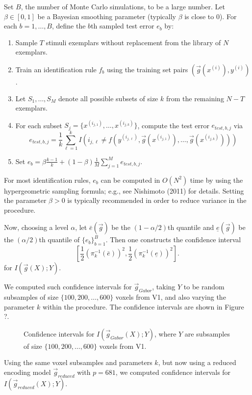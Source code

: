 \documentclass[12pt]{article}
\begin{document}
Set $B$, the number of Monte Carlo simulations, to be a large number.
Let $\beta \in [0, 1]$ be a Bayesian smoothing parameter (typically $\beta$ is close to 0).
For each $b = 1,\hdots, B$, define the $b$th sampled test error $e_b$ by:
\begin{enumerate}
\item Sample $T$ stimuli exemplars without replacement from the library of $N$ exemplars.
\item Train an identification rule $f_b$ using the training set pairs $(\vec{g}(x^{(i)}), y^{(i)})$.
\item Let $S_1,\hdots, S_M$ denote all possible subsets of size $k$ from the remaining $N-T$ exemplars.
\item For each subset $S_j = \{x^{(i_{j, 1})}, \hdots, x^{(i_{j, k})}\}$, compute the test error $e_{test, b, j}$ via
\[
e_{test, b, j} = \frac{1}{k} \sum_{\ell = 1}^k I(i_{j, \ell} \neq f(y^{(i_{j, \ell})}, \vec{g}(x^{(i_{j, 1})}),\hdots, \vec{g}(x^{(i_{j, k})})))
\]
\item Set $e_b = \beta\frac{k-1}{k} + (1-\beta) \frac{1}{M} \sum_{j=1}^M e_{test, b, j}$.
\end{enumerate}
For most identification rules, $e_b$ can be computed in $O(N^2)$ time
by using the hypergeometric sampling formula; e.g., see Nishimoto
(2011) for details.  Setting the parameter $\beta > 0$ is typically
recommended in order to reduce variance in the procedure.

Now, choosing a level $\alpha$, let $\bar{e}(\vec{g})$ be the $(1-\alpha/2)$th
quantile and $\underline{e}(\vec{g})$ be the $(\alpha/2)$th quantile of
$\{e_b\}_{b=1}^B$.  Then one constructs the confidence interval
\[
[\frac{1}{2}(\pi_k^{-1}(\bar{e}))^2, \frac{1}{2}(\pi_k^{-1}(\underline{e}))^2].
\]
for $I(\vec{g}(X); Y)$.

We computed such confidence intervals for $\vec{g}_{Gabor}$, taking
$Y$ to be random subsamples of size $\{100, 200, \hdots, 600\}$ voxels
from V1, and also varying the parameter $k$ within the procedure.
The confidence intervals are shown in Figure ?.

\begin{figure}
\centering
\caption{Confidence intervals for $I(\vec{g}_{Gabor}(X); Y)$, where $Y$ are subsamples of size $\{100, 200, \hdots, 600\}$ voxels
from V1.}
\end{figure}

Using the same voxel subsamples and parameters $k$, but now using a
reduced encoding model $\vec{g}_{reduced}$ with $p=681$,
we computed confidence intervals for
$I(\vec{g}_{reduced}(X); Y)$.
\end{document}
